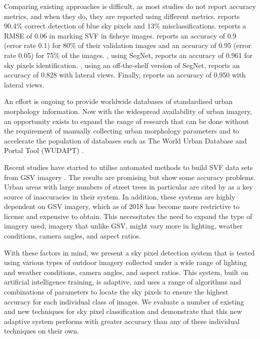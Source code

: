\documentclass[final,3p,times,authoryear]{elsarticle}
\begin{document}

Comparing existing approaches is difficult, as most studies do not report accuracy metrics, and when they do, they are reported using different metrics. \cite{Luo2002} reports 90.4\% correct detection of blue sky pixels and 13\% misclassifications. \cite{Chapman2004} reports a RMSE of 0.06 in marking SVF in fisheye images. \cite{Schmitt2009} reports an accuracy of 0.9 (error rate 0.1) for 80\% of their validation images and an accuracy of 0.95 (error rate 0.05) for 75\% of the images. \cite{Liang2017}, using SegNet, reports an accuracy of 0.961 for sky pixels identification. \cite{Shen2018}, using an off-the-shelf version of SegNet, reports an accuracy of 0.828 with lateral views. Finally, \cite{Middel2019} reports an accuracy of 0.950 with lateral views.

An effort is ongoing to provide worldwide databases of standardised urban morphology information. Now with the widespread availability of urban imagery, an opportunity exists to expand the range of research that can be done without the requirement of manually collecting urban morphology parameters and to accelerate the population of databases such as The World Urban Database and Portal Tool (WUDAPT) \citep{Mills2015}.

Recent studies have started to utilise automated methods to build SVF data sets from GSV imagery \citep{Middel2018,Gong2018}. The results are promising but show some accuracy problems. Urban areas with large numbers of street trees in particular are cited by \cite{Gong2018} as a key source of inaccuracies in their system. In addition, these systems are highly dependent on GSV imagery, which as of 2018 has become more restrictive to license and expensive to obtain. This necessitates the need to expand the type of imagery used, imagery that unlike GSV, might vary more in lighting, weather conditions, camera angles, and aspect ratios. 

With these factors in mind, we present a sky pixel detection system that is tested using various types of outdoor imagery collected under a wide range of lighting and weather conditions, camera angles, and aspect ratios. This system, built on artificial intelligence training, is adaptive, and uses a range of algorithms and combinations of parameters to locate the sky pixels to ensure the highest accuracy for each individual class of images. We evaluate a number of existing and new techniques for sky pixel classification and demonstrate that this new adaptive system performs with greater accuracy than any of these individual techniques on their own.
\end{document}
